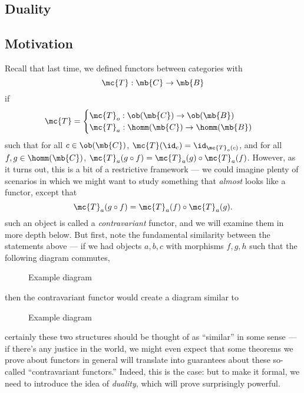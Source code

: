 \documentclass[nocover]{pset}
\begin{document}
\begin{adjustwidth}{1em}{1em}
  \section{Duality}
  \subsection{Motivation}
  Recall that last time, we defined functors between categories with
  \[
    \mc{T} : \mb{C} \to \mb{B}
  \]
  if
  \[
    \mc{T} =
    \begin{cases}
      \mc{T}_o : \ob(\mb{C}) \to \ob(\mb{B}) &  \\
      \mc{T}_a : \homm(\mb{C}) \to \homm(\mb{B}) &
    \end{cases}
  \]
  such that for all $c \in \ob(\mb{C})$, $\mc{T}(\id_c) =
  \id_{\mc{T}_o(c)}$, and for all $f,g \in \homm(\mb{C})$, $\mc{T}_a
  (g \circ f) = \mc{T}_a(g) \circ \mc{T}_a(f)$. However, as it turns
  out, this is a bit of a restrictive framework --- we could imagine
  plenty of scenarios in which we might want to study something that
  \emph{almost} looks like a functor, except that
  \[
    \mc{T}_a(g \circ f) = \mc{T}_a(f) \circ \mc{T}_a(g).
  \]
  such an object is called a \emph{contravariant} functor, and we will
  examine them in more depth below. But first, note the fundamental
  similarity between the statements above --- if we had objects
  $a,b,c$ with morphisms $f,g,h$ such that the following diagram
  commutes,
  \begin{figure}[H]
    \centering
    \tikzset{node distance=2cm, auto}
    \caption{Example diagram}
  \end{figure}
  then the contravariant functor would create a diagram similar to
  \begin{figure}[H]
    \centering
    \hspace{1.2cm}
    \tikzset{node distance=2cm, auto}
    \caption{Example diagram}
  \end{figure}
  certainly these two structures should be thought of as ``similar''
  in some sense --- if there's any justice in the world, we might even
  expect that some theorems we prove about functors in general will
  translate into guarantees about these so-called ``contravariant
  functors.'' Indeed, this is the case: but to make it formal, we need
  to introduce the idea of \emph{duality}, which will prove
  surprisingly powerful.

\end{adjustwidth}
\end{document}
